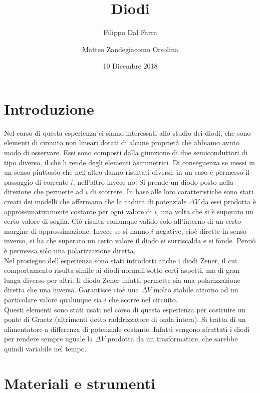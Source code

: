 \documentclass{article}
\title{Diodi}
\author{Filippo Dal Farra \and Matteo Zandegiacomo Orsolina}
\date{10 Dicembre 2018}
\begin{document}
\maketitle

\newpage

\section{Introduzione}

Nel corso di questa esperienza ci siamo interessati allo studio dei diodi, che sono elementi di circuito non lineari dotati di alcune proprietà che abbiamo avuto modo di osservare. Essi sono composti dalla giunzione di due semiconduttori di tipo diverso, il che li rende degli elementi asimmetrici. Di conseguenza se messi in un senso piuttosto che nell'altro danno risultati diversi: in un caso è permesso il passaggio di corrente $i$, nell'altro invece no. Si prende un diodo posto nella direzione che permette ad $i$ di scorrere. In base alle loro caratteristiche sono stati creati dei modelli che affermano che la caduta di potenziale $\Delta V$ da essi prodotta è approssimativamente costante per ogni valore di $i$, una volta che si è superato un certo valore di soglia. Ciò risulta comunque valido solo all'interno di un certo margine di approssimazione. Invece se si hanno $i$ negative, cioè dirette in senso inverso, si ha che superato un certo valore il diodo si surriscalda e si fonde. Perciò è permessa solo una polarizzazione diretta.\\ 
Nel prosieguo dell'esperienza sono stati introdotti anche i diodi Zener, il cui comportamento risulta simile ai diodi normali sotto certi aspetti, ma di gran lunga diverso per altri. Il diodo Zener infatti permette sia una polarizzazione diretta che una inversa. Garantisce cioè una $\Delta V$ molto stabile attorno ad un particolare valore qualunque sia $i$ che scorre nel circuito. \\
Questi elementi sono stati usati nel corso di questa esperienza per costruire un ponte di Graetz (altrimenti detto raddrizzatore di onda intera). Si tratta di un alimentatore a differenza di potenziale costante. Infatti vengono sfruttati i diodi per rendere sempre uguale la $\Delta V$ prodotta da un trasformatore, che sarebbe quindi variabile nel tempo.

\newpage

\section{Materiali e strumenti}
\end{document}
